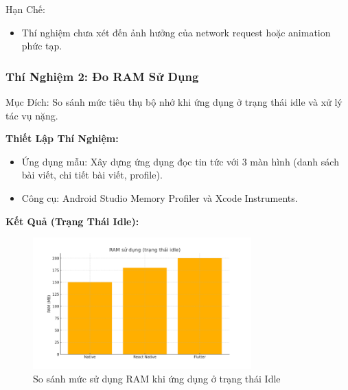   \hspace*{0.8cm}Hạn Chế:
  \setlength{\leftmargini}{1.5cm}
  \begin{itemize}
      \item Thí nghiệm chưa xét đến ảnh hưởng của network request hoặc animation phức tạp.
  \end{itemize}
\vspace{0.5em}

\subsubsection{Thí Nghiệm 2: Đo RAM Sử Dụng}
    
      \hspace*{0.8cm}Mục Đích: So sánh mức tiêu thụ bộ nhớ khi ứng dụng ở trạng thái idle và xử lý tác vụ nặng.
    \vspace{0.5em}

    
      \hspace*{0.8cm}\textbf{Thiết Lập Thí Nghiệm:}
      \setlength{\leftmargini}{1.5cm}
      \begin{itemize}
        \item Ứng dụng mẫu: Xây dựng ứng dụng đọc tin tức với 3 màn hình (danh sách bài viết, chi tiết bài viết, profile).
        \item Công cụ: Android Studio Memory Profiler và Xcode Instruments.
      \end{itemize}
    \vspace{0.5em}
    
    \vspace{0.5em}
    
    
      \hspace*{0.8cm}\textbf{Kết Quả (Trạng Thái Idle):}
    \vspace{0.5em}
    
    \begin{figure}[H]
        \centering
        \includegraphics[width=0.75\textwidth]{images/idle_memory_usage.png}
        \caption{So sánh mức sử dụng RAM khi ứng dụng ở trạng thái Idle}
    \end{figure}
    
